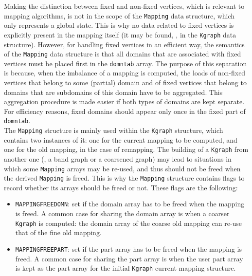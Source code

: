 Making the distinction between fixed and non-fixed vertices, which is
relevant to mapping algorithms, is not in the scope of the
\texttt{Mapping} data structure, which only represents a global
state. This is why no data related to fixed vertices is explicitly
present in the mapping itself (it may be found, \eg, in the
\texttt{Kgraph} data structure).
However, for handling fixed vertices in an efficient way, the
semantics of the \texttt{Mapping} data structure is that all domains
that are associated with fixed vertices must be placed first in the
\texttt{domntab} array. The purpose of this separation is because,
when the imbalance of a mapping is computed, the loads of non-fixed
vertices that belong to some (partial) domain and of fixed vertices
that belong to domains that are subdomains of this domain have to be
aggregated. This aggregation procedure is made easier if both types of
domains are kept separate. For efficiency reasons, fixed domains
should appear only once in the fixed part of \texttt{domntab}.
\\

The \texttt{Mapping} structure is mainly used within the
\texttt{Kgraph} structure, which contains two instances of it: one for
the current mapping to be computed, and one for the old mapping, in
the case of remapping. The building of a \texttt{Kgraph} from another
one (\eg, a band graph or a coarsened graph) may lead to situations in
which some \texttt{Mapping} arrays may be re-used, and thus should not
be freed when the derived \texttt{Mapping} is freed. This is why the
\texttt{Mapping} structure contains flags to record whether its arrays
should be freed or not. These flags are the following:
\begin{itemize}
\item
\texttt{MAPPINGFREEDOMN}: set if the domain array has to be freed when
the mapping is freed. A common case for sharing the domain array is
when a coarser \texttt{Kgraph} is computed: the domain array of the
coarse old mapping can re-use that of the fine old mapping.
\item
\texttt{MAPPINGFREEPART}: set if the part array has to be freed when
the mapping is freed. A common case for sharing the part array is when
the user part array is kept as the part array for the initial
\texttt{Kgraph} current mapping structure.
\end{itemize}

